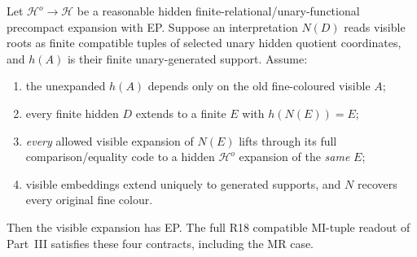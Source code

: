 \begin{lemma}
\label{lem:ep-tuple-transfer}
Let \(\mathcal H^o\to\mathcal H\) be a reasonable
hidden finite-relational/unary-functional
precompact expansion with EP.
Suppose an interpretation \(N(D)\)
reads visible roots as finite compatible
tuples of selected unary hidden
quotient coordinates, and \(h(A)\)
is their finite unary-generated support.
Assume:
\begin{enumerate}[label=(\textup{\roman*}),leftmargin=*]
\item the unexpanded \(h(A)\) depends only
on the old fine-coloured visible \(A\);
\item every finite hidden \(D\) extends
to a finite \(E\) with \(h(N(E))=E\);
\item \emph{every} allowed visible
expansion of \(N(E)\) lifts through
its full comparison/equality code
to a hidden \(\mathcal H^o\)
expansion of the \emph{same} \(E\);
\item visible embeddings extend uniquely
to generated supports, and \(N\)
recovers every original fine colour.
\end{enumerate}
Then the visible expansion has EP.
The full R18 compatible MI-tuple
readout of Part~III satisfies these
four contracts, including the MR case.
\end{lemma}
